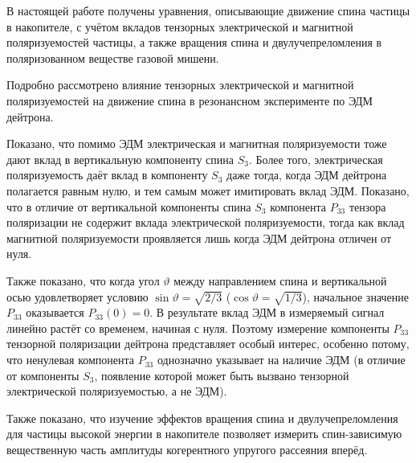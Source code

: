 \documentclass[11pt,a4paper]{article}
\begin{document}
В настоящей работе получены уравнения, описывающие движение спина частицы
в накопителе, с учётом вкладов тензорных электрической и магнитной
поляризуемостей частицы, а также вращения спина и двулучепреломления
в поляризованном веществе газовой мишени.

Подробно рассмотрено влияние тензорных электрической и магнитной
поляризуемостей на движение спина в резонансном эксперименте по ЭДМ дейтрона.

Показано, что помимо ЭДМ электрическая и магнитная поляризуемости тоже
дают вклад в вертикальную компоненту спина $S_3$. Более того, электрическая
поляризуемость даёт вклад в компоненту $S_3$ даже тогда, когда ЭДМ дейтрона
полагается равным нулю, и тем самым может имитировать вклад ЭДМ.
Показано, что в отличие от вертикальной компоненты спина $S_3$ компонента
$P_{33}$ тензора поляризации не содержит вклада электрической
поляризуемости, тогда как вклад магнитной поляризуемости проявляется
лишь когда ЭДМ дейтрона отличен от нуля.

Также показано, что когда угол $\vartheta$ между направлением спина
и вертикальной осью удовлетворяет условию
$\sin\vartheta=\sqrt{2/3}$ ($\cos\vartheta=\sqrt{1/3}$), начальное
значение $P_{33}$ оказывается $P_{33}(0)=0$. В результате вклад ЭДМ
в измеряемый сигнал линейно растёт со временем, начиная с нуля.
Поэтому измерение компоненты $P_{33}$ тензорной поляризации дейтрона
представляет особый интерес, особенно потому, что ненулевая компонента
$P_{33}$ однозначно указывает на наличие ЭДМ (в отличие от компоненты
$S_3$, появление которой может быть вызвано тензорной электрической
поляризуемостью, а не ЭДМ).

Также показано, что изучение эффектов вращения спина и двулучепреломления
для частицы высокой энергии в накопителе позволяет измерить спин-зависимую
вещественную часть амплитуды когерентного упругого рассеяния вперёд.
\end{document}
